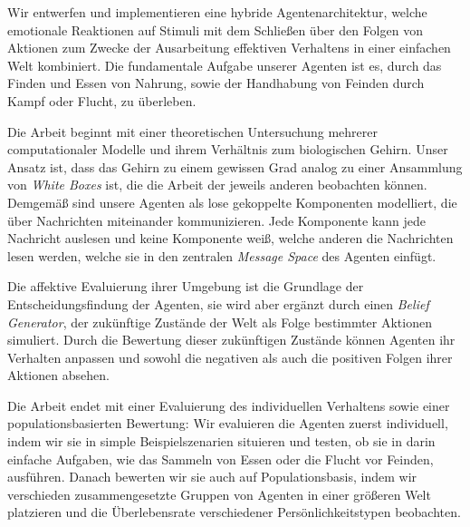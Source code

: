 \documentclass[draft,final]{vutinfth}
\begin{document}
	\begin{kurzfassung}
		Wir entwerfen und implementieren eine hybride Agentenarchitektur, welche emotionale Reaktionen auf Stimuli mit dem Schließen über den Folgen von Aktionen zum Zwecke der Ausarbeitung effektiven Verhaltens in einer einfachen Welt kombiniert. Die fundamentale Aufgabe unserer Agenten ist es, durch das Finden und Essen von Nahrung, sowie der Handhabung von Feinden durch Kampf oder Flucht, zu überleben.
		
		Die Arbeit beginnt mit einer theoretischen Untersuchung mehrerer computationaler Modelle und ihrem Verhältnis zum biologischen Gehirn. Unser Ansatz ist, dass das Gehirn zu einem gewissen Grad analog zu einer Ansammlung von \emph{White Boxes} ist, die die Arbeit der jeweils anderen beobachten können. Demgemäß sind unsere Agenten als lose gekoppelte Komponenten modelliert, die über Nachrichten miteinander kommunizieren. Jede Komponente kann jede Nachricht auslesen und keine Komponente weiß, welche anderen die Nachrichten lesen werden, welche sie in den zentralen \emph{Message Space} des Agenten einfügt.
		
		Die affektive Evaluierung ihrer Umgebung ist die Grundlage der Entscheidungsfindung der Agenten, sie wird aber ergänzt durch einen \emph{Belief Generator}, der zukünftige Zustände der Welt als Folge bestimmter Aktionen simuliert. Durch die Bewertung dieser zukünftigen Zustände können Agenten ihr Verhalten anpassen und sowohl die negativen als auch die positiven Folgen ihrer Aktionen absehen.
		
		Die Arbeit endet mit einer Evaluierung des individuellen Verhaltens sowie einer populationsbasierten Bewertung: Wir evaluieren die Agenten zuerst individuell, indem wir sie in simple Beispielszenarien situieren und testen, ob sie in darin einfache Aufgaben, wie das Sammeln von Essen oder die Flucht vor Feinden, ausführen. Danach bewerten wir sie auch auf Populationsbasis, indem wir verschieden zusammengesetzte Gruppen von Agenten in einer größeren Welt platzieren und die Überlebensrate verschiedener Persönlichkeitstypen beobachten.
	\end{kurzfassung}
	
	
	\tableofcontents %
	
	\mainmatter
	
\end{document}
